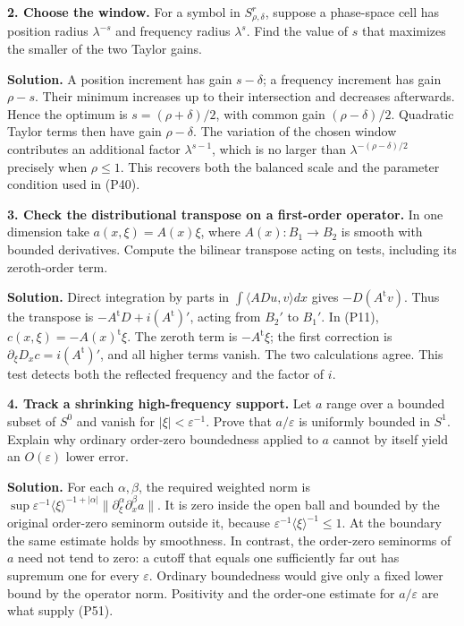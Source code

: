 \documentclass[
  11pt,
]{article}
\begin{document}
\textbf{2. Choose the window.} For a symbol in \(S^r_{\rho,\delta}\),
suppose a phase-space cell has position radius \(\lambda^{-s}\) and
frequency radius \(\lambda^s\). Find the value of \(s\) that maximizes
the smaller of the two Taylor gains.

\textbf{Solution.} A position increment has gain \(s-\delta\); a
frequency increment has gain \(\rho-s\). Their minimum increases up to
their intersection and decreases afterwards. Hence the optimum is
\(s=(\rho+\delta)/2\), with common gain \((\rho-\delta)/2\). Quadratic
Taylor terms then have gain \(\rho-\delta\). The variation of the chosen
window contributes an additional factor \(\lambda^{s-1}\), which is no
larger than \(\lambda^{-(\rho-\delta)/2}\) precisely when \(\rho\leq1\).
This recovers both the balanced scale and the parameter condition used
in (P40).

\textbf{3. Check the distributional transpose on a first-order
operator.} In one dimension take \(a(x,\xi)=A(x)\xi\), where
\(A(x):B_1\to B_2\) is smooth with bounded derivatives. Compute the
bilinear transpose acting on tests, including its zeroth-order term.

\textbf{Solution.} Direct integration by parts in
\(\int\langle A D u,v\rangle dx\) gives \(-D(A^{\mathrm t}v)\). Thus the
transpose is \(-A^{\mathrm t}D+i(A^{\mathrm t})'\), acting from \(B_2'\)
to \(B_1'\). In (P11), \(c(x,\xi)=-A(x)^{\mathrm t}\xi\). The zeroth
term is \(-A^{\mathrm t}\xi\); the first correction is
\(\partial_\xi D_xc=i(A^{\mathrm t})'\), and all higher terms vanish.
The two calculations agree. This test detects both the reflected
frequency and the factor of \(i\).

\textbf{4. Track a shrinking high-frequency support.} Let \(a\) range
over a bounded subset of \(S^0\) and vanish for
\(|\xi|<\varepsilon^{-1}\). Prove that \(a/\varepsilon\) is uniformly
bounded in \(S^1\). Explain why ordinary order-zero boundedness applied
to \(a\) cannot by itself yield an \(O(\varepsilon)\) lower error.

\textbf{Solution.} For each \(\alpha,\beta\), the required weighted norm
is
\(\sup\varepsilon^{-1}\langle\xi\rangle^{-1+|\alpha|}\|\partial_\xi^\alpha\partial_x^\beta a\|\).
It is zero inside the open ball and bounded by the original order-zero
seminorm outside it, because
\(\varepsilon^{-1}\langle\xi\rangle^{-1}\leq1\). At the boundary the
same estimate holds by smoothness. In contrast, the order-zero seminorms
of \(a\) need not tend to zero: a cutoff that equals one sufficiently
far out has supremum one for every \(\varepsilon\). Ordinary boundedness
would give only a fixed lower bound by the operator norm. Positivity and
the order-one estimate for \(a/\varepsilon\) are what supply (P51).
\end{document}
